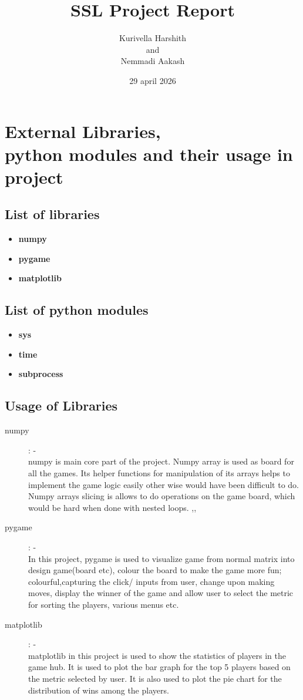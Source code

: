 \documentclass[12pt,letterpaper]{article}
\begin{document}
\title{SSL Project Report}
\author{Kurivella Harshith\\ and\\ Nemmadi Aakash}
\date{29 april 2026}
\maketitle
\tableofcontents
\clearpage
\section{External Libraries, \\python modules and their usage in project}
\subsection{List of libraries}
\begin{itemize}
    \item \textbf{numpy} 
    \item \textbf{pygame}
    \item \textbf{matplotlib}
\end{itemize}
\subsection{List of python modules}
\begin{itemize}
    \item \textbf{sys}
    \item \textbf{time}
    \item \textbf{subprocess}
\end{itemize}
\subsection{Usage of Libraries}
\begin{description}
    \item[numpy] : -\\numpy is main core part of the project. Numpy array is used as board 
    for all the games. Its helper functions for manipulation of its arrays helps to implement 
    the game logic easily other wise would have been difficult to do. Numpy arrays slicing is 
    allows to do operations on the game board, which would be hard when done with nested loops.
    \cite{w3schools_numpy_tutorial},\cite{w3schools_numpy_reference},\cite{numpy_docs}
    \item[pygame] : -\\In this project, pygame is used to 
    visualize game from normal matrix into design game(board etc), 
    colour the board to make the game more fun; colourful,capturing the click/
    inputs from user, change upon making moves, display the winner of the game and allow user 
    to select the metric for sorting the players, various menus etc.\cite{pygame_docs}
    \item[matplotlib]: - \\matplotlib in this project is used to show the statistics of 
    players in the game hub. It is used to plot the bar graph for the top 5 players based on 
    the metric selected by user. It is also used to plot the pie chart for the distribution 
    of wins among the players.\cite{matplotlib_tutorial}   
\end{description}
\end{document}
